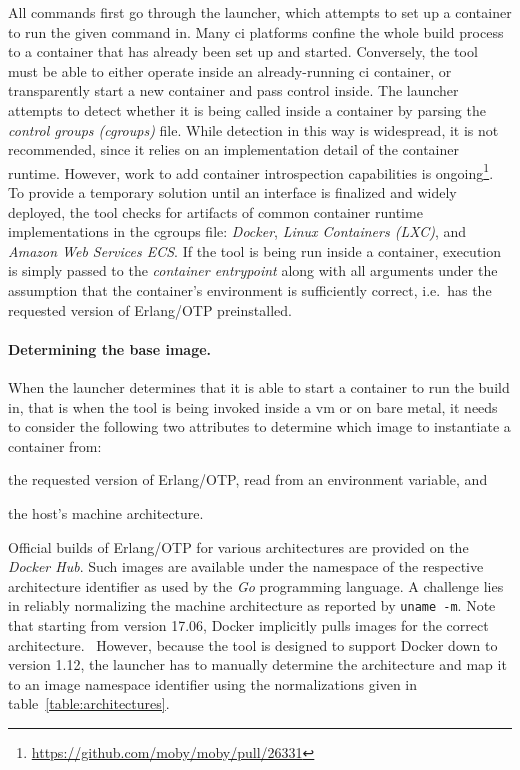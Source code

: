 All commands first go through the launcher, which attempts to set up a container to run the given command in. Many \acrshort{ci} platforms confine the whole build process to a container that has already been set up and started. Conversely, the tool must be able to either operate inside an already-running \acrshort{ci} container, or transparently start a new container and pass control inside. The launcher attempts to detect whether it is being called inside a container by parsing the \emph{control groups (cgroups)} file. While detection in this way is widespread, it is not recommended, since it relies on an implementation detail of the container runtime. However, work to add container introspection capabilities is ongoing\footnote{\url{https://github.com/moby/moby/pull/26331}}. To provide a temporary solution until an interface is finalized and widely deployed, the tool checks for artifacts of common container runtime implementations in the cgroups file: \emph{Docker}, \emph{Linux Containers (LXC)}, and \emph{Amazon Web Services ECS}. If the tool is being run inside a container, execution is simply passed to the \emph{container entrypoint} along with all arguments under the assumption that the container's environment is sufficiently correct, i.e.~has the requested version of Erlang/OTP preinstalled.

\paragraph{Determining the base image.} When the launcher determines that it is able to start a container to run the build in, that is when the tool is being invoked inside a \acrshort{vm} or on bare metal, it needs to consider the following two attributes to determine which image to instantiate a container from:
\begin{enumerate*}[label=(\roman*)]
  \item the requested version of Erlang/OTP, read from an environment variable, and
  \item the host's machine architecture.
\end{enumerate*}

Official builds of Erlang/OTP for various architectures are provided on the \emph{Docker Hub}. Such images are available under the namespace of the respective architecture identifier as used by the \emph{Go} programming language. A challenge lies in reliably normalizing the machine architecture as reported by \lstinline|uname -m|. Note that starting from version 17.06, Docker implicitly pulls images for the correct architecture.~\cite{docker:docs} However, because the tool is designed to support Docker down to version 1.12, the launcher has to manually determine the architecture and map it to an image namespace identifier using the normalizations given in table~\ref{table:architectures}.

